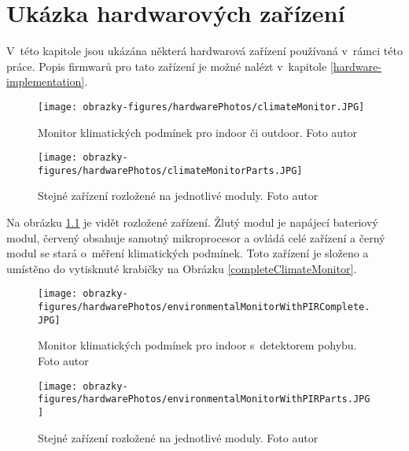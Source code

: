


\chapter{Ukázka hardwarových zařízení} \label{appendices-hardware-images}
V~této kapitole jsou ukázána některá hardwarová zařízení používaná v~rámci této práce. Popis firmwarů pro tato zařízení je možné nalézt v~kapitole \ref{hardware-implementation}.

\begin{figure}[H]
  \begin{minipage}[b]{0.4\textwidth}
    \texttt{[image: obrazky-figures/hardwarePhotos/climateMonitor.JPG]}
    \caption{Monitor klimatických podmínek pro indoor či outdoor. Foto autor}
    \label{completeClimateMonitor}
  \end{minipage}
  \hfill
  \begin{minipage}[b]{0.4\textwidth}
    \texttt{[image: obrazky-figures/hardwarePhotos/climateMonitorParts.JPG]}
    \caption{Stejné zařízení rozložené na jednotlivé moduly. Foto autor}
    \label{disasembeledClimateMonitor}
  \end{minipage}
\end{figure}

Na obrázku \ref{disasembeledClimateMonitor} je vidět rozložené zařízení. Žlutý modul je napájecí bateriový modul, červený obsahuje samotný mikroprocesor a ovládá celé zařízení a černý modul se stará o~měření klimatických podmínek. Toto zařízení je složeno a umístěno do vytisknuté krabičky na Obrázku \ref{completeClimateMonitor}.

\begin{figure}[H]
  \begin{minipage}[b]{0.4\textwidth}
    \texttt{[image: obrazky-figures/hardwarePhotos/environmentalMonitorWithPIRComplete.JPG]}
    \caption{Monitor klimatických podmínek pro indoor s~detektorem pohybu. Foto autor}
    \label{completeCO2Monitor}
  \end{minipage}
  \hfill
  \begin{minipage}[b]{0.4\textwidth}
    \texttt{[image: obrazky-figures/hardwarePhotos/environmentalMonitorWithPIRParts.JPG]}
    \caption{Stejné zařízení rozložené na jednotlivé moduly. Foto autor}
    \label{disasembeledCO2Monitor}
  \end{minipage}
\end{figure}

